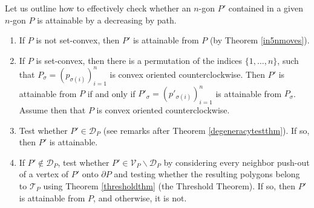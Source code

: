 \documentclass[11pt]{amsart}
\theoremstyle{remark}
\numberwithin{equation}{section}
\newcommand{\D}{\mathcal{D}}
\newcommand{\TT}{\mathcal{T}}
\newcommand{\V}{\mathcal{V}}
\begin{document}
Let us outline how to effectively check whether an $n$-gon $P'$ contained in  a given $n$-gon $P$ is attainable by a decreasing by path.
\begin{enumerate}
\item
If $P$ is not set-convex, then $P'$ is attainable from $P$ (by Theorem \ref{in5nmoves}).

\item
If $P$ is set-convex, then there is a permutation of the indices $\{1,\ldots,n\}$, such that $P_{\sigma}=(p_{\sigma(i)})_{i=1}^n$
is convex oriented counterclockwise. Then $P'$ is attainable from $P$ if and only if $P'_\sigma=(p'_{\sigma(i)})_{i=1}^n$ is attainable from $P_{\sigma}$. Assume then that $P$ is convex oriented counterclockwise.

\item
Test whether  $P'\in \D_P$ (see remarks after Theorem \ref{degeneracytestthm}). If so, then $P'$ is attainable. 

\item
If $P'\notin \D_P$, test whether $P'\in \V_P\backslash \D_P$ by considering every 
neighbor push-out of a vertex of $P'$ onto $\partial P$ and testing whether the resulting polygons belong to $\TT_P$ using Theorem \ref{thresholdthm}
(the Threshold Theorem). If so, then $P'$ is attainable from $P$, and otherwise, it is not.    
\end{enumerate}
\end{document}
